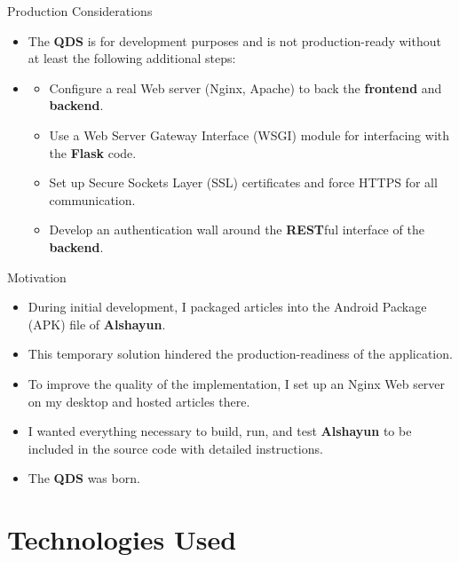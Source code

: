 \documentclass{beamer}
\begin{document}
\begin{frame}{Production Considerations}
    \begin{itemize}
        \item The \textbf{QDS} is for development purposes and is not
            production-ready without at least the following additional steps:
        \item
            \begin{itemize}[font=$\bullet$\scshape\bfseries]
            \item Configure a real Web server (Nginx, Apache) to back the
                \textbf{frontend} and \textbf{backend}.
            \item Use a Web Server Gateway Interface (WSGI) module for
                interfacing with the \textbf{Flask} code.
            \item Set up Secure Sockets Layer (SSL) certificates and force HTTPS
                for all communication.
            \item Develop an authentication wall around the \textbf{REST}ful
                interface of the \textbf{backend}.
            \end{itemize}
    \end{itemize}
\end{frame}

\begin{frame}{Motivation}
    \begin{itemize}
        \item During initial development, I packaged articles into the Android
            Package (APK) file of \textbf{Alshayun}.
        \item This temporary solution hindered the production-readiness of the
            application.
        \item To improve the quality of the implementation, I set up an Nginx
            Web server on my desktop and hosted articles there.
        \item I wanted everything necessary to build, run, and test
            \textbf{Alshayun} to be included in the source code with detailed
            instructions.
        \item The \textbf{QDS} was born.
    \end{itemize}
\end{frame}

\section{Technologies Used}
\end{document}
